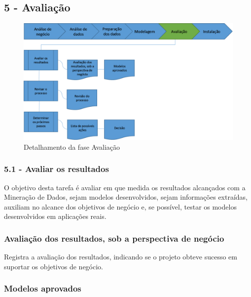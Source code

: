 \newpage 

\subsection*{5 - Avaliação}


\begin{figure}[H]
	\includegraphics[scale=0.8]{img/CRISP-DM-Avaliacao.png}
	\caption{Detalhamento da fase Avaliação}
	\label{img:CRISP-DM-Avaliacao}
\end{figure}


\subsubsection*{\textbf{5.1 - Avaliar os resultados}}

O objetivo desta tarefa é avaliar em que medida os resultados alcançados com a Mineração de Dados, sejam modelos desenvolvidos, sejam informações extraídas, auxiliam no alcance dos objetivos de negócio e, se possível, testar os modelos desenvolvidos em aplicações reais.

\subsubsection*{Avaliação dos resultados, sob a perspectiva de negócio}

Registra a avaliação dos resultados, indicando se o projeto obteve sucesso em suportar os objetivos de negócio.

\subsubsection*{Modelos aprovados}

